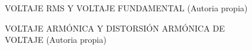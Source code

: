     \begin{figure}[H]
      \hfill
      \hfill
      \hfill
      \caption{VOLTAJE RMS Y VOLTAJE FUNDAMENTAL (Autoria propia)}
      \end{figure}
    \begin{figure}[H]
      \hfill
      \hfill
      \hfill
      \caption{VOLTAJE ARMÓNICA Y DISTORSIÓN ARMÓNICA DE VOLTAJE (Autoria propia)}
      \label{fig:Voltaje-armonico}
      \end{figure}


